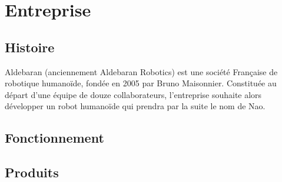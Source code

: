 \chapter*{Entreprise}
\label{Entreprise}
\thispagestyle{fancy}

\section{Histoire}
\label{Entreprise: histoire}
Aldebaran (anciennement Aldebaran Robotics) est une société Française de robotique humanoïde, fondée en 2005 par Bruno Maisonnier. 
Constituée au départ d'une équipe de douze collaborateurs, l'entreprise souhaite alors développer un robot humanoïde qui prendra par la suite le nom de Nao. 

\section{Fonctionnement}

\section{Produits}